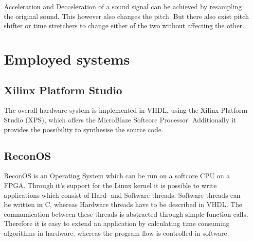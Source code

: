 				Acceleration and Decceleration of a sound signal can be achieved by resampling the original sound. This however also changes the pitch.
				But there also exist pitch shifter or time stretchers to change either of the two without affecting the other.
		
		
		
			
			
			
		
	\section{Employed systems}
	  \subsection{Xilinx Platform Studio}
	    The overall hardware system is implemented in VHDL, using the Xilinx Platform Studio (XPS), which offers the MicroBlaze Softcore Processor. Additionally it provides the possibility to synthesise the source code.
	  
	  \subsection{ReconOS}
		ReconOS is an Operating System which can be run on a softcore CPU on a FPGA. Through it's support for the Linux kernel it is possible to write applications which consist of Hard- and Software threads. Software threads can be written in C, whereas Hardware threads have to be described in VHDL. The communication between these threads is abstracted through simple function calls. Therefore it is easy to extend an application by calculating time consuming algorithms in hardware, whereas the program flow is controlled in software.

